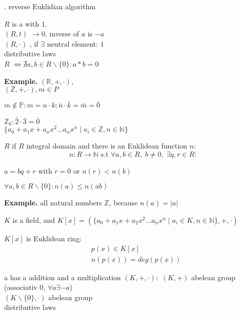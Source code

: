 \Proof.
reverse Euklidian algorithm

\begin{definition}
$R$ is a  with $1$. \\
$(R,t)$  $\rightarrow 0$, inverse of $a$ is $-a$\\
$(R,\cdot)$ , if $\exists$ neutral element: $1$ \\
distributive laws\\
$R$  $\iff \nexists a,b \in R \backslash \{0\}: a*b = 0$
\end{definition}

\textbf{Example.}
$(\mathbb{R}, +, \cdot)$, \\
$(\mathbb{Z}, + , \cdot), m \in P$

$m\not\in \mathbb{P}: m = n \cdot k : \bar{n} \cdot \bar{k} = \bar{m} = \bar{0}$

$\mathbb{Z}_6 : \bar{2} \cdot \bar{3} = \bar{0}$ \\
$\{a_0 + a_1 x + a_x x^2 \ldots a_n x^n \mid a_i \in \mathbb{Z}, n \in \mathbb{N} \}$

\begin{definition}
$R$  if $R$ integral domain and there is an Euklidean function $n$:
\[
  n : R \rightarrow \mathbb{N} \text{ s.t } \forall a,b \in R,\; b \neq 0,\; \exists q,r \in R:
\]

\begin{compactenum}
\item $a = bq + r$ with $r = 0$ or $n(r) < n(b)$
\item $\forall a,b \in R \backslash \{0\} : n(a) \leq n(ab)$
\end{compactenum}
\end{definition}

\textbf{Example.}
all natural numbers $\mathbb{Z}$, because $n(a) = |a|$

$K$ is a field, and $K[x] = 
\left(\{a_0 + a_1 x + a_2 x^2 \ldots a_n x^n \mid a_i \in K, n \in \mathbb{N} \}
,+, \cdot \right)$

$K[x]$ is Euklidean ring:
\begin{align*}
  &p(x) \in K[x] \\
  &n(p(x)) = deg(p(x))
\end{align*}

\begin{definition}
a  has a addition and a multiplication
$(K, +, \cdot):$ 
  $(K,+)$ abelean group (associativ 0, $\forall a \exists -a$) \\
  $(K \backslash \{0\}, \cdot)$ abelean group \\
  distributive laws
\end{definition}

